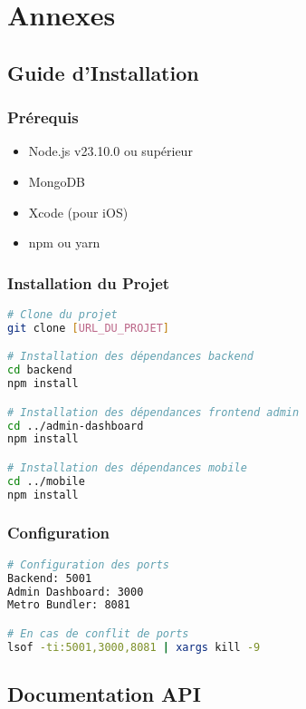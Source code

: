 \chapter{Annexes}

\section{Guide d'Installation}
\subsection{Prérequis}
\begin{itemize}
    \item Node.js v23.10.0 ou supérieur
    \item MongoDB
    \item Xcode (pour iOS)
    \item npm ou yarn
\end{itemize}

\subsection{Installation du Projet}
\begin{lstlisting}[language=bash]
# Clone du projet
git clone [URL_DU_PROJET]

# Installation des dépendances backend
cd backend
npm install

# Installation des dépendances frontend admin
cd ../admin-dashboard
npm install

# Installation des dépendances mobile
cd ../mobile
npm install
\end{lstlisting}

\subsection{Configuration}
\begin{lstlisting}[language=bash]
# Configuration des ports
Backend: 5001
Admin Dashboard: 3000
Metro Bundler: 8081

# En cas de conflit de ports
lsof -ti:5001,3000,8081 | xargs kill -9
\end{lstlisting}

\section{Documentation API}

